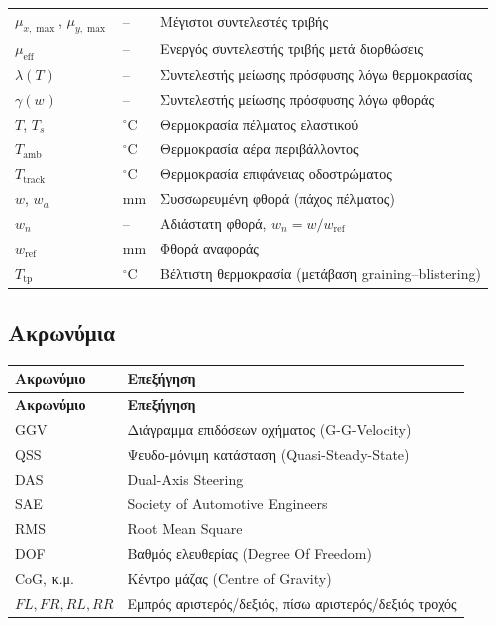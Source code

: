 {\begin{longtable}{@{}p{3cm} p{2.3cm} p{9cm}@{}}
$\mu_{x,\max}$, $\mu_{y,\max}$ & --  & Μέγιστοι συντελεστές τριβής \\
$\mu_{\text{eff}}$ & --       & Ενεργός συντελεστής τριβής μετά διορθώσεις \\
$\lambda(T)$       & --       & Συντελεστής μείωσης πρόσφυσης λόγω θερμοκρασίας \\
$\gamma(w)$        & --       & Συντελεστής μείωσης πρόσφυσης λόγω φθοράς \\
$T$, $T_s$         & $^\circ$C & Θερμοκρασία πέλματος ελαστικού \\
$T_{\text{amb}}$   & $^\circ$C & Θερμοκρασία αέρα περιβάλλοντος \\
$T_{\text{track}}$ & $^\circ$C & Θερμοκρασία επιφάνειας οδοστρώματος \\
$w$, $w_a$         & mm       & Συσσωρευμένη φθορά (πάχος πέλματος) \\
$w_n$              & --       & Αδιάστατη φθορά, $w_n = w/w_{\text{ref}}$ \\
$w_{\text{ref}}$   & mm       & Φθορά αναφοράς \\
$T_{\mathrm{tp}}$ & $^\circ$C & Βέλτιστη θερμοκρασία (μετάβαση graining--blistering) \\
\bottomrule
\end{longtable}

\subsection*{Ακρωνύμια}
\begin{longtable}{@{}p{4cm} p{11.5cm}@{}}
\toprule
\textbf{Ακρωνύμιο} & \textbf{Επεξήγηση} \\
\midrule
\endfirsthead
\toprule
\textbf{Ακρωνύμιο} & \textbf{Επεξήγηση} \\
\midrule
\endhead
\bottomrule
\endfoot
GGV     & Διάγραμμα επιδόσεων οχήματος (G-G-Velocity) \\
QSS     & Ψευδο-μόνιμη κατάσταση (Quasi-Steady-State) \\
DAS     & Dual-Axis Steering \\
SAE     & Society of Automotive Engineers \\
RMS     & Root Mean Square \\
DOF     & Βαθμός ελευθερίας (Degree Of Freedom) \\
CoG, κ.μ. & Κέντρο μάζας (Centre of Gravity) \\
$FL, FR, RL, RR$   & Εμπρός αριστερός/δεξιός, πίσω αριστερός/δεξιός τροχός \\
\end{longtable}

}%
